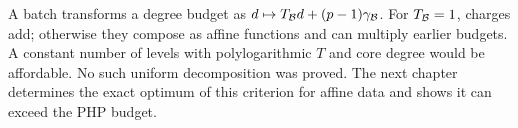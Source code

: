 \begin{remark}
A batch transforms a degree budget as $d\mapsto T_{\mathcal B}d+(p-1)\gamma_{\mathcal B}$. For $T_{\mathcal B}=1$, charges add; otherwise they compose as affine functions and can multiply earlier budgets. A constant number of levels with polylogarithmic $T$ and core degree would be affordable. No such uniform decomposition was proved. The next chapter determines the exact optimum of this criterion for affine data and shows it can exceed the PHP budget.
\end{remark}
